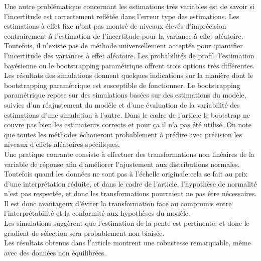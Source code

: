 \documentclass{article}
\begin{document}
Une autre problématique concernant les estimations très variables est de savoir si l'incertitude est correctement reflétée dans l'erreur type des estimations. Les estimations à effet fixe n'ont pas montré de niveaux élevés d'imprécision contrairement à l'estimation de l'incertitude pour la variance à effet aléatoire. Toutefois, il n'existe pas de méthode universellement acceptée pour quantifier l'incertitude des variances à effet aléatoire. Les probabilités de profil, l'estimation bayésienne ou le bootstrapping paramétrique offrent trois options très différentes. Les résultats des simulations donnent quelques indications sur la manière dont le bootstrapping paramétrique est susceptible de fonctionner. Le bootstrapping paramétrique repose sur des simulations basées sur des estimations du modèle, suivies d'un réajustement du modèle et d'une évaluation de la variabilité des estimations d'une simulation à l'autre. Dans le cadre de l’article le bootstrap ne couvre pas bien les estimateurs corrects et pour ça il n’a pas été utilisé. On note que toutes les méthodes échoueront probablement à prédire avec précision les niveaux d'effets aléatoires spécifiques.\\


Une pratique courante consiste à effectuer des transformations non linéaires de la variable de réponse afin d'améliorer l'ajustement aux distributions normales. Toutefois quand les données  ne sont pas à l'échelle originale cela se fait au prix d'une interprétation réduite, et dans le cadre de l’article, l'hypothèse de normalité n’est pas respectée,  et donc les transformations pourraient ne pas être nécessaires. Il est donc avantageux d'éviter la transformation face au compromis entre l'interprétabilité et la conformité aux hypothèses du modèle. \\



Les simulations suggèrent que l'estimation de la pente est pertinente, et donc le gradient de sélection sera probablement non biaisée.\\
Les résultats obtenus dans l’article montrent une robustesse remarquable, même avec des données non équilibrées. \\
\end{document}
